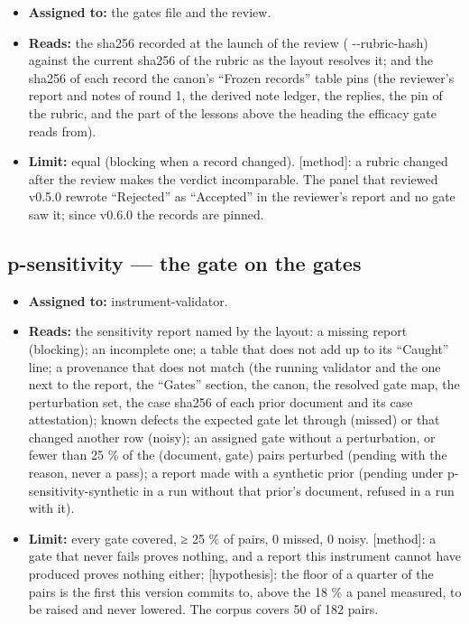 \documentclass[
  american,
  10pt,
]{report}
\providecommand{\tightlist}{%
  \setlength{\itemsep}{0pt}\setlength{\parskip}{0pt}}
\renewcommand{\texttt}[1]{{\ttfamily\hyphenchar\font=-1 #1}}
\begin{document}
\begin{itemize}
\tightlist
\item
  \textbf{Assigned to:} the gates file and the review.
\item
  \textbf{Reads:} the sha256 recorded at the launch of the review
  (\texttt{-\allowbreak{}-\allowbreak{}rubric-\allowbreak{}hash})
  against the current sha256 of the rubric as the layout resolves it;
  and the sha256 of each record the canon's ``Frozen records'' table
  pins (the reviewer's report and notes of round 1, the derived note
  ledger, the replies, the pin of the rubric, and the part of the
  lessons above the heading the efficacy gate reads from).
\item
  \textbf{Limit:} equal (blocking when a record changed).
  \texttt{[method]}: a rubric changed after the review makes the verdict
  incomparable. The panel that reviewed v0.5.0 rewrote ``Rejected'' as
  ``Accepted'' in the reviewer's report and no gate saw it; since v0.6.0
  the records are pinned.
\end{itemize}

\subsection{\texorpdfstring{\texttt{p-\allowbreak{}sensitivity} --- the
gate on the
gates}{ --- the gate on the gates}}\label{p-sensitivity-the-gate-on-the-gates}

\begin{itemize}
\tightlist
\item
  \textbf{Assigned to:} \texttt{instrument-\allowbreak{}validator}.
\item
  \textbf{Reads:} the sensitivity report named by the layout: a missing
  report (blocking); an incomplete one; a table that does not add up to
  its ``Caught'' line; a provenance that does not match (the running
  validator and the one next to the report, the ``Gates'' section, the
  canon, the resolved gate map, the perturbation set, the
  \texttt{case sha256} of each prior document and its
  \texttt{case attestation}); known defects the expected gate let
  through (missed) or that changed another row (noisy); an assigned gate
  without a perturbation, or fewer than 25 \% of the (document, gate)
  pairs perturbed (pending with the reason, never a pass); a report made
  with a synthetic prior (pending under
  \texttt{p-\allowbreak{}sensitivity-\allowbreak{}synthetic} in a run
  without that prior's document, refused in a run with it).
\item
  \textbf{Limit:} every gate covered, ≥ 25 \% of pairs, 0 missed, 0
  noisy. \texttt{[method]}: a gate that never fails proves nothing, and
  a report this instrument cannot have produced proves nothing either;
  \texttt{[hypothesis]}: the floor of a quarter of the pairs is the
  first this version commits to, above the 18 \% a panel measured, to be
  raised and never lowered. The corpus covers 50 of 182 pairs.
\end{itemize}
\end{document}
